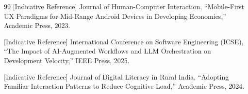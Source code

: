 \documentclass[12pt,a4paper]{report}
\begin{document}
\begin{thebibliography}{99}
[Indicative Reference] Journal of Human-Computer Interaction, ``Mobile-First UX Paradigms for Mid-Range Android Devices in Developing Economies,'' Academic Press, 2023.

[Indicative Reference] International Conference on Software Engineering (ICSE), ``The Impact of AI-Augmented Workflows and LLM Orchestration on Development Velocity,'' IEEE Press, 2025.

[Indicative Reference] Journal of Digital Literacy in Rural India, ``Adopting Familiar Interaction Patterns to Reduce Cognitive Load,'' Academic Press, 2024.

\end{thebibliography}
\end{document}
